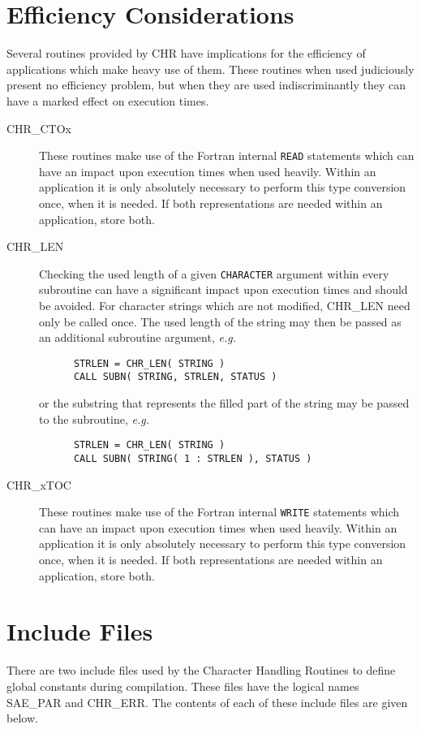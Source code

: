 \section{Efficiency Considerations}
Several routines provided by CHR have implications for the efficiency of
applications which make heavy use of them.
These routines when used judiciously present no efficiency problem, but
when they are used indiscriminantly they can have a marked effect on 
execution times.

\begin {description}
\item [CHR\_CTOx] These routines make use of the Fortran internal {\tt READ}
statements which can have an impact upon execution times when used heavily.
Within an application it is only absolutely necessary to perform this type
conversion once, when it is needed.
If both representations are needed within an application, store both.
\item [CHR\_LEN] Checking the used length of a given {\tt CHARACTER} 
argument within every subroutine can have a significant impact upon execution
times and should be avoided.
For character strings which are not modified, CHR\_LEN need only be called
once.
The used length of the string may then be passed as an additional subroutine
argument, {\em e.g.}
\begin {small}
\begin{verbatim}
      STRLEN = CHR_LEN( STRING )
      CALL SUBN( STRING, STRLEN, STATUS )
\end{verbatim}
\end {small}
or the substring that represents the filled part of the string may be passed
to the subroutine, {\em e.g.}
\begin {small}
\begin{verbatim}
      STRLEN = CHR_LEN( STRING )
      CALL SUBN( STRING( 1 : STRLEN ), STATUS )
\end{verbatim}
\end {small}
\item [CHR\_xTOC] These routines make use of the Fortran internal {\tt WRITE}
statements which can have an impact upon execution times when used heavily.
Within an application it is only absolutely necessary to perform this type
conversion once, when it is needed.
If both representations are needed within an application, store both.
\end {description}


\appendix
\section {Include Files \label{incl_sect}}
There are two include files used by the Character Handling Routines
to define global constants during compilation. 
These files have the logical names SAE\_PAR and CHR\_ERR.
The contents of each of these include files are given below.

